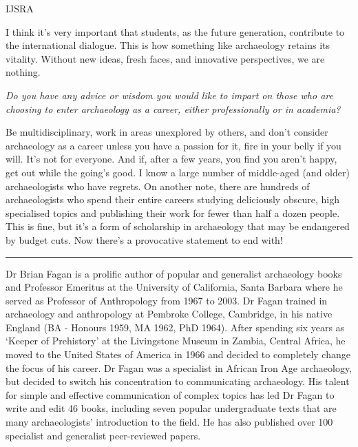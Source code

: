 \begin{labeling}{IJSRA}
\item[BMF] I think it’s very important that students, as the future generation, contribute to the international dialogue. This is how something like archaeology retains its vitality. Without new ideas, fresh faces, and innovative perspectives, we are nothing.

\item[IJSRA] \emph{Do you have any advice or wisdom you would like to impart on those who are choosing to enter archaeology as a career, either professionally or in academia?}

\item[BMF]Be multidisciplinary, work in areas unexplored by others, and don’t consider archaeology as a career unless you have a passion for it, fire in your belly if you will. It’s not for everyone. And if, after a few years, you find you aren’t happy, get out while the going’s good. I know a large number of middle-aged (and older) archaeologists who have regrets. On another note, there are hundreds of archaeologists who spend their entire careers studying deliciously obscure, high specialised topics and publishing their work for fewer than half a dozen people. This is fine, but it’s a form of scholarship in archaeology that may be endangered by budget cuts. Now there’s a provocative statement to end with!           

  \end{labeling}
\noindent\rule[0.5ex]{\linewidth}{1pt}

\begin{aquote}
	Dr Brian Fagan is a prolific author of popular and generalist archaeology books and Professor Emeritus at the University of California, Santa Barbara where he served as Professor of Anthropology from 1967 to 2003. Dr Fagan trained in archaeology and anthropology at Pembroke College, Cambridge, in his native England (BA - Honours 1959, MA 1962, PhD 1964). After spending six years as ‘Keeper of Prehistory’ at the Livingstone Museum in Zambia, Central Africa, he moved to the United States of America in 1966 and decided to completely change the focus of his career. Dr Fagan was a specialist in African Iron Age archaeology, but decided to switch his concentration to communicating archaeology. His talent for simple and effective communication of complex topics has led Dr Fagan to write and edit 46 books, including seven popular undergraduate texts that are many archaeologists’ introduction to the field. He has also published over 100 specialist and generalist peer-reviewed papers.
	\end{aquote}
	



	\label{Pasch:lastpage}
\closingarticle